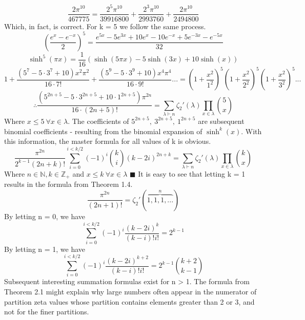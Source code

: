 \documentclass[12pt]{article}
\begin{document}
\[\frac{2\pi^{10}}{467775} = \frac{2^5\pi^{10}}{39916800} + \frac{2^3\pi^{10}}{2993760} + \frac{2\pi^{10}}{2494800}\]
Which, in fact, is correct.
\newline
For k = 5 we follow the same process.
\[\left(\frac{e^x-e^{-x}}{2}\right)^5=\frac{e^{5x}-5e^{3x}+10e^x-10e^{-x}+5e^{-3x}-e^{-5x}}{32}\]
\[\sinh^5(\pi x)=\frac{1}{16}(\sinh(5\pi x)-5\sinh(3x) + 10\sinh(x))\]
\[1 + \frac{(5^7 -5\cdot 3^7 + 10)x^2\pi^2}{16\cdot 7!}+\frac{(5^9 -5\cdot 3^9 + 10)x^4\pi^4}{16\cdot 9!}...=\left(1+\frac{x^2}{1^2}\right)^5\left(1+\frac{x^2}{2^2}\right)^5\left(1+\frac{x^2}{3^2}\right)^5...\]
\[\therefore \frac{(5^{2n+5} - 5\cdot 3^{2n+5} + 10\cdot 1^{2n+5})\pi^{2n}}{16 \cdot (2n+5)!} = \sum_{\lambda \vdash n}\zeta_2'(\lambda)\prod_{x \in \lambda}\binom{5}{x}\]
Where \(x \leq 5\ \forall x \in \lambda\).
\newline
\newline
The coefficients of \(5^{2n+5},\ 3^{2n+5},\ 1^{2n+5}\) are subsequent binomial coefficients - resulting from the binomial expansion of \(\sinh^k(x)\). With this information, the master formula for all values of k is obvious.
\[\frac{\pi^{2n}}{2^{k-1}(2n+k)!}\sum_{i=0}^{i<k/2}(-1)^i\binom{k}{i}(k-2i)^{2n+k}=\sum_{
\lambda \vdash n}\zeta_2'(\lambda)\prod_{x \in \lambda}\binom{k}{x}\]
Where \(n \in \mathbb{N},k \in \mathbb{Z}_+\) and \(x \leq k\ \forall x \in \lambda\)
\newline \(\blacksquare\) \newline
It is easy to see that letting k = 1 results in the formula from Theorem 1.4.
\[\frac{\pi^{2n}}{(2n+1)!} = \zeta_2'(\overbrace{1,1,1,...}^n)\]
By letting n = 0, we have
\[\sum_{i=0}^{i<k/2}(-1)^i\frac{(k-2i)^k}{(k-i)!i!} = 2^{k-1}\]
By letting n = 1, we have
\[\sum_{i=0}^{i<k/2}(-1)^i\frac{(k-2i)^{k+2}}{(k-i)!i!}=2^{k-1}\binom{k+2}{k-1}\]
Subsequent interesting summation formulas exist for n > 1.
\newline
\newline
The formula from Theorem 2.1 might explain why large numbers often appear in the numerator of partition zeta values whose partition contains elements greater than 2 or 3, and not for the finer partitions.
\newpage

\end{document}
